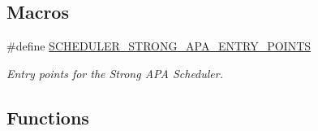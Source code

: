 \subsection*{Macros}
\begin{DoxyCompactItemize}
\item 
\#define \hyperlink{group__RTEMSScoreSchedulerStrongAPA_ga98b37281082c0be47dc489eed554c5cc}{S\+C\+H\+E\+D\+U\+L\+E\+R\+\_\+\+S\+T\+R\+O\+N\+G\+\_\+\+A\+P\+A\+\_\+\+E\+N\+T\+R\+Y\+\_\+\+P\+O\+I\+N\+TS}
\begin{DoxyCompactList}\small\item\em Entry points for the Strong A\+PA Scheduler. \end{DoxyCompactList}\end{DoxyCompactItemize}
\subsection*{Functions}
